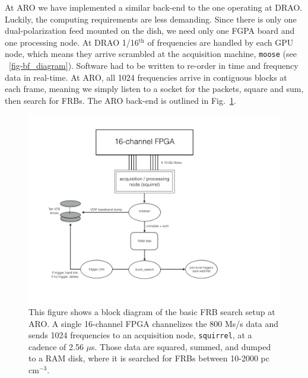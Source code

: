 At ARO we have implemented a similar back-end to the 
one operating at DRAO. Luckily, the computing 
requirements are less demanding. Since there is only 
one dual-polarization feed mounted on the dish, 
we need only one FGPA board and one processing node. 
At DRAO 1/16$^{\textrm{th}}$ of frequencies are 
handled by each GPU node, which means they arrive scrambled
at the acquisition machine, {\tt moose} (see ~\ref{fig-bf_diagram}). 
Software had to be written to re-order in time and frequency 
data in real-time. At ARO, all 1024 frequencies arrive in contiguous 
blocks at each frame, meaning we simply listen to a socket 
for the packets, square and sum, then search for FRBs. The ARO 
back-end is outlined in Fig.~\ref{fig-aro_diagram}.


\begin{figure}[!h]
\label{fig-aro_diagram}
\begin{center}
\includegraphics[trim={0in, 0in, 0in, 0in}, width=\textwidth]{./figures/beamforming/aro_diagram.jpeg}
\caption[abc]{This figure shows a block diagram of the basic 
     FRB search setup at ARO. A single 16-channel FPGA
     channelizes the 800 Ms/s data and sends 1024 frequencies 
     to an acquisition node, {\tt squirrel}, at a cadence of 2.56 $\mu$s.
     Those data are squared, summed, and dumped to a RAM disk, 
     where it is searched for FRBs between 10-2000 pc cm$^{-3}$.}
\vspace{0.4cm}   
\end{center}
\end{figure}

